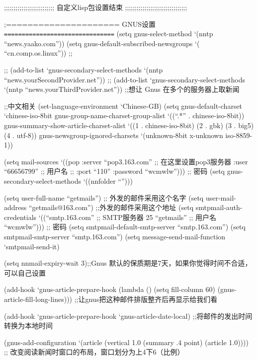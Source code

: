 \documentclass[11pt]{article}
\begin{document}
\begin{itemize}
 


;;;;;;;;;;;;;;;;;;;;;;;;;; 自定义lisp包设置结束  ;;;;;;;;;;;;;;;;;;;;;;;;;;;;;;;;

 


;=====================    GNUS设置  \texttt{===============================}
(setq gnus-select-method `(nntp ``news.yaako.com''))
(setq gnus-default-subscribed-newsgroups
  `( ``cn.comp.os.linux'')) ;;

;; (add-to-list `gnus-secondary-select-methods `(nntp ``news.yourSecondProvider.net''))
;; (add-to-list `gnus-secondary-select-methods `(nntp ``news.yourThirdProvider.net''))
;;想让 Gnus 在多个的服务器上取新闻


;;中文相关
(set-language-environment `Chinese-GB)
(setq gnus-default-charset `chinese-iso-8bit
   gnus-group-name-charset-group-alist `((``.*'' . chinese-iso-8bit))
   gnus-summary-show-article-charset-alist
       `((1 . chinese-iso-8bit)
         (2 . gbk)
         (3 . big5)
         (4 . utf-8))
   gnus-newsgroup-ignored-charsets
       `(unknown-8bit x-unknown iso-8859-1))


(setq mail-sources
       `((pop :server ``pop3.163.com'' ;; 在这里设置pop3服务器
       :user ``66656799'' ;; 用户名
;;       :port ``110''
       :password ``wcmwlw''))) ;; 密码
(setq gnus-secondary-select-methods `((nnfolder ``'')))

 

(setq user-full-name ``getmails'') ;; 外发的邮件采用这个名字
(setq user-mail-address ``getmails@163.com'') ;;外发的邮件采用这个地址
(setq smtpmail-auth-credentials
      `((``smtp.163.com'' ;; SMTP服务器
      25
      ``getmails'' ;; 用户名
      ``wcmwlw''))) ;; 密码
(setq smtpmail-default-smtp-server ``smtp.163.com'')
(setq smtpmail-smtp-server ``smtp.163.com'')
(setq message-send-mail-function `smtpmail-send-it)

(setq nnmail-expiry-wait 3);;Gnus 默认的保质期是7天，如果你觉得时间不合适，可以自己设置

(add-hook `gnus-article-prepare-hook
          (lambda ()
            (setq fill-column 60)
            (gnus-article-fill-long-lines)))
;;让gnus把这种邮件排版整齐后再显示给我们看

(add-hook `gnus-article-prepare-hook `gnus-article-date-local)
;;将邮件的发出时间转换为本地时间

(gnus-add-configuration `(article
                          (vertical 1.0
                                    (summary .4 point)
                                    (article 1.0))))
;; 改变阅读新闻时窗口的布局，窗口划分为上4下6（比例）


\end{itemize}
\end{document}
